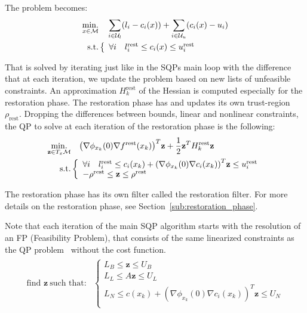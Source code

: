 The problem becomes:
\begin{align}
\label{eq:restoration_problem_simple}
  \operatorname*{min.}_{x \in \mathcal{M}} & \quad \sum_{i\in\mathcal{U}_l} (l_i - c_i(x)) +\sum_{i\in\mathcal{U}_u} (c_i(x) - u_i)\\ \nonumber
  \text{s.t.}&\left\{
  \begin{array}{lr}
    \forall i \quad l^\text{rest}_i \leq c_i(x) \leq u^\text{rest}_i \\
  \end{array}\right.
\end{align}


That is solved by iterating just like in the SQPs main loop with the difference that at each iteration, we update the problem based on new lists of unfeasible constraints.
An approximation $H^\text{rest}_k$ of the Hessian is computed especially for the restoration phase.
The restoration phase has and updates its own trust-region $\rho_\text{rest}$.
Dropping the differences between bounds, linear and nonlinear constraints, the QP to solve at each iteration of the restoration phase is the following:
\begin{align}
  \label{eq:QP_restoration}
  \begin{split}
  \operatorname*{min.}_{\mathbf{z} \in T_x\mathcal{M} } & \quad {\left(\nabla\phi_{x_k}(0) \nabla f^\text{rest} (x_k)\right)}^T\mathbf{z} + \frac{1}{2} {\bf z }^T H^\text{rest}_k{\bf z }\\
  \text{s.t.}&\left\{
  \begin{array}{lr}
    \forall i \quad l^\text{rest}_i \leq c_i(x_k) + {\left(\nabla\phi_{x_k}(0) \nabla c_i (x_k)\right)}^T\mathbf{z} \leq u^\text{rest}_i \\
    -\rho^\text{rest} \leq \mathbf{z} \leq \rho^\text{rest} \\
  \end{array}\right.
  \end{split}
\end{align}


The restoration phase has its own filter called the restoration filter.
For more details on the restoration phase, see Section~\ref{sub:restoration_phase}.

Note that each iteration of the main SQP algorithm starts with the resolution of an FP (Feasibility Problem), that consists of the same linearized constraints as the QP problem~ without the cost function.
\begin{align}
  \label{eq:FP_txm}
  \begin{split}
  \text{find } \mathbf{z}\ \text{such that:}&\left\{
  \begin{array}{lr}
    L_B \leq \mathbf{z} \leq U_B \\
    L_L \leq A \mathbf{z} \leq U_L \\
    L_N \leq c(x_k) + {\left(\nabla\phi_{x_k}(0) \nabla c_i (x_k)\right)}^T\mathbf{z}\leq U_N\\
  \end{array}\right.
  \end{split}
\end{align}

